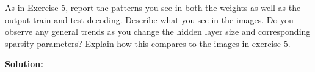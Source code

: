 \documentclass[10pt]{article}
\begin{document}
\begin{itemize}
As in Exercise 5, report the patterns you see in both the weights as well as the output train and test decoding.  Describe what you see in the images.  Do you observe any general trends as you change the hidden layer size and corresponding sparsity parameters?  Explain how this compares to the images in exercise 5.

{\bf Solution:} 




\end{itemize}
\end{document}
